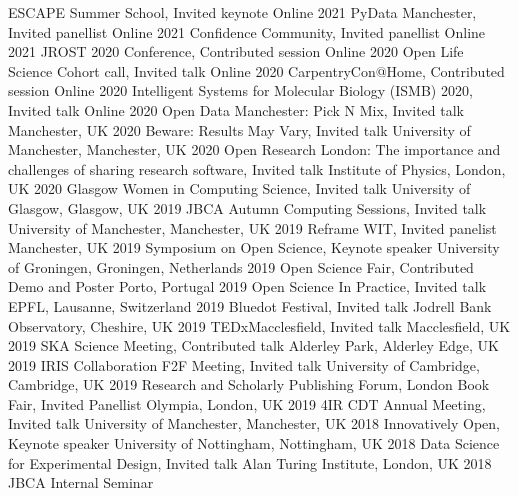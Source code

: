 \begin{cvpress} 
   \cvpres
    {ESCAPE Summer School, Invited keynote}
    {Online}
    {2021}
   \cvpres
    {PyData Manchester, Invited panellist}
    {Online}
    {2021}
   \cvpres
    {Confidence Community, Invited panellist}
    {Online}
    {2021}
   \cvpres
    {JROST 2020 Conference, Contributed session}
    {Online}
    {2020}
   \cvpres
    { Open Life Science Cohort call, Invited talk}
    {Online}
    {2020}
   \cvpres
    {CarpentryCon@Home, Contributed session}
    {Online}
    {2020}
   \cvpres
    {Intelligent Systems for Molecular Biology (ISMB) 2020, Invited talk}
    {Online}
    {2020}
   \cvpres
    {Open Data Manchester: Pick N Mix, Invited talk}
    {Manchester, UK}
    {2020}
   \cvpres
    {Beware: Results May Vary, Invited talk}
    {University of Manchester, Manchester, UK}
    {2020}
   \cvpres
    {Open Research London: The importance and challenges of sharing research software, Invited talk}
    {Institute of Physics, London, UK}
    {2020}
   \cvpres
    {Glasgow Women in Computing Science, Invited talk}
    {University of Glasgow, Glasgow, UK}
    {2019}
   \cvpres
    {JBCA Autumn Computing Sessions, Invited talk}
    {University of Manchester, Manchester, UK}
    {2019}
   \cvpres
    {Reframe WIT, Invited panelist}
    {Manchester, UK}
    {2019}
   \cvpres
    {Symposium on Open Science, Keynote speaker}
    {University of Groningen, Groningen, Netherlands}
    {2019}
   \cvpres
    {Open Science Fair, Contributed Demo and Poster}
    {Porto, Portugal}
    {2019} 
   \cvpres
    {Open Science In Practice, Invited talk}
    {EPFL, Lausanne, Switzerland}
    {2019} 
   \cvpres
    {Bluedot Festival, Invited talk}
    {Jodrell Bank Observatory, Cheshire, UK}
    {2019} 
   \cvpres
    {TEDxMacclesfield, Invited talk}
    {Macclesfield, UK}
    {2019} 
   \cvpres
    {SKA Science Meeting, Contributed talk}
    {Alderley Park, Alderley Edge, UK}
    {2019}  
   \cvpres
    {IRIS Collaboration F2F Meeting, Invited talk}
    {University of Cambridge, Cambridge, UK}
    {2019}  
   \cvpres
    {Research and Scholarly Publishing Forum, London Book Fair, Invited Panellist}
    {Olympia, London, UK}
    {2019} 
   \cvpres
    {4IR CDT Annual Meeting, Invited talk}
    {University of Manchester, Manchester, UK}
    {2018}  
   \cvpres
    {Innovatively Open, Keynote speaker}
    {University of Nottingham, Nottingham, UK}
    {2018}  
   \cvpres
    {Data Science for Experimental Design, Invited talk}
    {Alan Turing Institute, London, UK}
    {2018}  
   \cvpres
    {JBCA Internal Seminar}

\end{cvpress}
